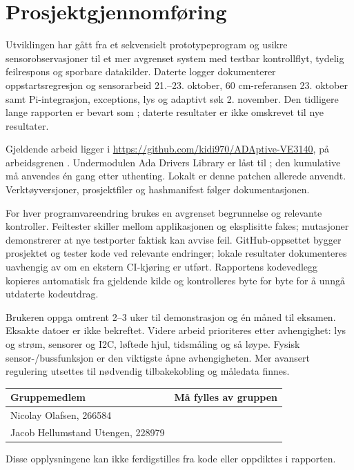 \chapter{Prosjektgjennomføring}
\label{ch:process}
Utviklingen har gått fra et sekvensielt prototypeprogram og usikre
sensorobservasjoner til et mer avgrenset system med testbar kontrollflyt,
tydelig feilrespons og sporbare datakilder. Daterte logger dokumenterer
oppstartsregresjon og sensorarbeid 21.--23. oktober, 60 cm-referansen
23. oktober samt Pi-integrasjon, exceptions, lys og adaptivt søk 2. november.
Den tidligere lange rapporten er bevart som ;
daterte resultater er ikke omskrevet til nye resultater.

Gjeldende arbeid ligger i
\url{https://github.com/kidi970/ADAptive-VE3140}, på arbeidsgrenen
.
Undermodulen Ada Drivers Library er låst til
; den kumulative
 må anvendes én gang etter
uthenting. Lokalt er denne patchen allerede anvendt. Verktøyversjoner,
prosjektfiler og hashmanifest følger dokumentasjonen.

For hver programvareendring brukes en avgrenset begrunnelse og relevante
kontroller. Feiltester skiller mellom applikasjonen og eksplisitte fakes;
mutasjoner demonstrerer at nye testporter faktisk kan avvise feil.
GitHub-oppsettet bygger prosjektet og tester kode ved relevante endringer;
lokale resultater dokumenteres uavhengig av om en ekstern CI-kjøring er utført.
Rapportens kodevedlegg kopieres automatisk fra gjeldende kilde og
kontrolleres byte for byte for å unngå utdaterte kodeutdrag.

Brukeren oppga omtrent 2--3 uker til demonstrasjon og én måned til eksamen.
Eksakte datoer er ikke bekreftet. Videre arbeid prioriteres etter avhengighet:
lys og strøm, sensorer og I2C, løftede hjul, tidsmåling og så løype.
Fysisk sensor-/bussfunksjon er den viktigste åpne avhengigheten.
Mer avansert regulering utsettes til nødvendig tilbakekobling og måledata finnes.

\begin{tabularx}{\textwidth}{@{}P{42mm}Y@{}}\toprule
Gruppemedlem & Må fylles av gruppen\\\midrule
Nicolay Olafsen, 266584 & \\
Jacob Hellumstand Utengen, 228979 & \\\bottomrule
\end{tabularx}

Disse opplysningene kan ikke ferdigstilles fra kode eller oppdiktes i rapporten.
